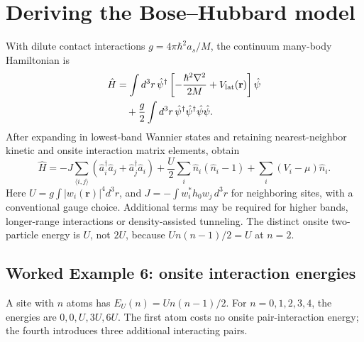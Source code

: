 \documentclass[11pt,a4paper]{article}
\newcommand{\ex}[1]{\subsection*{Worked Example #1}}
\begin{document}
\section{Deriving the Bose--Hubbard model}
With dilute contact interactions $g=4\pi\hbar^2a_s/M$, the continuum many-body Hamiltonian is
\begin{align}\hat H&=\int d^3r\,\hat\psi^\dagger\left[-\frac{\hbar^2\nabla^2}{2M}+V_{\rm lat}(\mathbf r)\right]\hat\psi\\&\quad+\frac g2\int d^3r\,\hat\psi^\dagger\hat\psi^\dagger\hat\psi\hat\psi.\end{align}
After expanding in lowest-band Wannier states and retaining nearest-neighbor kinetic and onsite interaction matrix elements, obtain
\begin{equation}\boxed{\hat H=-J\sum_{\langle i,j\rangle}(\hat a_i^\dagger\hat a_j+\hat a_j^\dagger\hat a_i)+\frac U2\sum_i\hat n_i(\hat n_i-1)+\sum_i(V_i-\mu)\hat n_i.}\end{equation}
Here $U=g\int|w_i(\mathbf r)|^4d^3r$, and $J=-\int w_i^*h_0w_j\,d^3r$ for neighboring sites, with a conventional gauge choice. Additional terms may be required for higher bands, longer-range interactions or density-assisted tunneling. The distinct onsite two-particle energy is $U$, not $2U$, because $U n(n-1)/2=U$ at $n=2$.
\ex{6: onsite interaction energies} A site with $n$ atoms has $E_U(n)=Un(n-1)/2$. For $n=0,1,2,3,4$, the energies are $0,0,U,3U,6U$. The first atom costs no onsite pair-interaction energy; the fourth introduces three additional interacting pairs.
\end{document}

